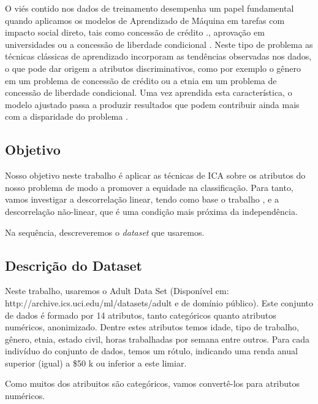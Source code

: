 \documentclass[11pt]{article}
\begin{document}
O viés contido nos dados de treinamento desempenha um papel fundamental
quando aplicamos os modelos de Aprendizado de Máquina em tarefas com
impacto social direto, tais como concessão de crédito \cite{ONeil2016}.,
aprovação em universidades \cite{ONeil2016} ou a concessão de liberdade
condicional \cite{Chouldechova2017}. Neste tipo de problema as técnicas
clássicas de aprendizado incorporam as tendências observadas nos dados,
o que pode dar origem a atributos discriminativos, como por exemplo o
gênero em um problema de concessão de crédito ou a etnia em um problema
de concessão de liberdade condicional. Uma vez aprendida esta
característica, o modelo ajustado passa a produzir resultados que podem
contribuir ainda mais com a disparidade do problema \cite{ONeil2016}.

    \hypertarget{objetivo}{%
\subsection{Objetivo}\label{objetivo}}

Nosso objetivo neste trabalho é aplicar as técnicas de ICA
\cite{Hyvarinen2001} sobre os atributos do nosso problema de modo a
promover a equidade na classificação. Para tanto, vamos investigar a
descorrelação linear, tendo como base o trabalho \cite{Zafar2017}, e a
descorrelação não-linear, que é uma condição mais próxima da
independência.

Na sequência, descreveremos o \emph{dataset} que usaremos.

    \hypertarget{descriuxe7uxe3o-do-dataset}{%
\subsection{Descrição do Dataset}\label{descriuxe7uxe3o-do-dataset}}

Neste trabalho, usaremos o Adult Data Set (Disponível em:
http://archive.ics.uci.edu/ml/datasets/adult e de domínio público). Este
conjunto de dados é formado por 14 atributos, tanto categóricos quanto
atributos numéricos, anonimizado. Dentre estes atributos temos idade,
tipo de trabalho, gênero, etnia, estado civil, horas trabalhadas por
semana entre outros. Para cada indivíduo do conjunto de dados, temos um
rótulo, indicando uma renda anual superior (igual) a \$50 k ou inferior
a este limiar.

Como muitos dos atribuitos são categóricos, vamos convertê-los para
atributos numéricos.
\end{document}
